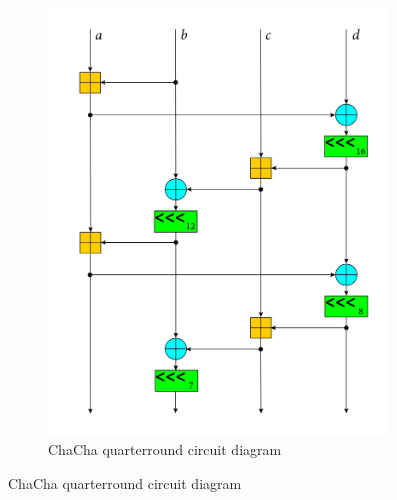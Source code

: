 \begin{figure}
\begin{subfigure}[t]{0.5\textwidth}
  \includegraphics[width=0.99\textwidth]{figures/wiki-qr-circuit/chacha-wiki-qr-circuit.png}
  \caption{ChaCha quarterround circuit diagram}
  \label{fig:wiki.qr.circuit.chacha}
\end{subfigure}%
\end{figure}

